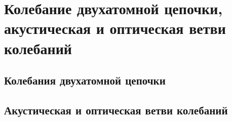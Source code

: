 \section{Колебание двухатомной цепочки, акустическая и оптическая ветви колебаний}
\subsection{Колебания двухатомной цепочки}
\subsection{Акустическая и оптическая ветви колебаний}